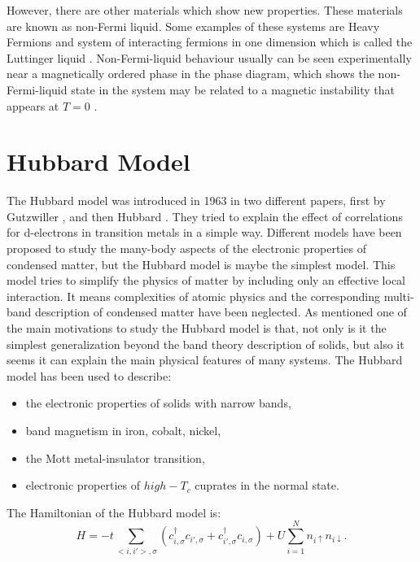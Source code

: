 However, there are other materials which show new properties. These materials are known as non-Fermi liquid. Some examples of these systems are Heavy Fermions \cite{Stewart} and system of interacting fermions in one dimension which is called the Luttinger liquid \cite{Schulz}. Non-Fermi-liquid behaviour usually can be seen experimentally near a magnetically ordered phase in the phase diagram, which shows the non-Fermi-liquid state in the system may be related to a magnetic instability that appears at $T=0$ \cite{Stewart}. 



\section{Hubbard Model}
The Hubbard model was introduced in 1963 in two different papers, first by Gutzwiller \cite{Gutzwiller}, and then Hubbard \cite{Hubbard}. They tried to explain the effect of correlations for d-electrons in transition metals in a simple way\cite{Monto}. Different models have been proposed to study the many-body aspects of the electronic properties of condensed matter, but the Hubbard model is maybe the simplest model. This model tries to simplify the physics of matter by including only an effective local interaction. It means complexities of atomic physics and the corresponding multi-band description of condensed matter have been neglected\cite{Mario}. As mentioned one of the main motivations to study the Hubbard model is that, not only is it the simplest generalization beyond the band theory description of solids, but also it seems it can explain the main physical features of many systems. The Hubbard model has been used to describe\cite{Fabian}:
\begin{itemize}
    \item the electronic properties of solids with narrow bands,
    \item band magnetism in iron, cobalt, nickel,
    \item the Mott metal-insulator transition,
    \item electronic properties of $high-T_c$ cuprates in the normal state.
\end{itemize}
The Hamiltonian of the Hubbard model is:
\begin{equation}
\label{eqn:Hubbard}
H=-t\sum_{<i,i'>,\sigma}(c_{i,\sigma}^{\dagger}c_{i',\sigma}+c_{i',\sigma}^{\dagger}c_{i,\sigma})
+U\sum_{i=1}^Nn_{i\uparrow}n_{i\downarrow}.
\end{equation}

